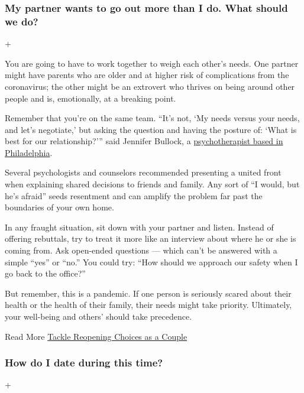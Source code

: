 \hypertarget{my-partner-wants-to-go-out-more-than-i-do-what-should-we-do}{%
\subsubsection{My partner wants to go out more than I do. What should we
do?}\label{my-partner-wants-to-go-out-more-than-i-do-what-should-we-do}}

+

You are going to have to work together to weigh each other's needs. One
partner might have parents who are older and at higher risk of
complications from the coronavirus; the other might be an extrovert who
thrives on being around other people and is, emotionally, at a breaking
point.

Remember that you're on the same team. ``It's not, `My needs versus your
needs, and let's negotiate,' but asking the question and having the
posture of: `What is best for our relationship?''' said Jennifer
Bullock, a \href{https://www.letsdevelopphilly.com/}{psychotherapist
based in Philadelphia}.

Several psychologists and counselors recommended presenting a united
front when explaining shared decisions to friends and family. Any sort
of ``I would, but he's afraid'' seeds resentment and can amplify the
problem far past the boundaries of your own home.

In any fraught situation, sit down with your partner and listen. Instead
of offering rebuttals, try to treat it more like an interview about
where he or she is coming from. Ask open-ended questions --- which can't
be answered with a simple ``yes'' or ``no.'' You could try: ``How should
we approach our safety when I go back to the office?''

But remember, this is a pandemic. If one person is seriously scared
about their health or the health of their family, their needs might take
priority. Ultimately, your well-being and others' should take
precedence.

 Read More
\href{https://www.nytimes3xbfgragh.onion/2020/07/11/at-home/couples-coronavirus-pandemic.html}{Tackle
Reopening Choices as a Couple}

\hypertarget{how-do-i-date-during-this-time}{%
\subsubsection{How do I date during this
time?}\label{how-do-i-date-during-this-time}}

+

